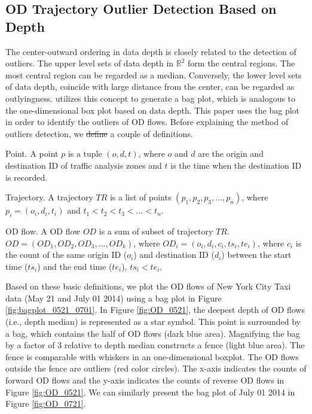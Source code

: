 \documentclass[a4paper,UKenglish]{lipics-v2016}
\providecommand{\DIFadd}[1]{{\protect\color{blue}\uwave{#1}}} %
\providecommand{\DIFdel}[1]{{\protect\color{red}\sout{#1}}}                      %
\providecommand{\DIFaddbegin}{} %
\providecommand{\DIFaddend}{} %
\providecommand{\DIFdelbegin}{} %
\providecommand{\DIFdelend}{} %
\begin{document}
\subsection{OD  {Trajectory } Outlier Detection Based on Depth}
The center-outward ordering in data depth is closely related to the detection of outliers.
The upper level sets of data depth in $\mathbb{R}^2$ form the central regions.
The most central region can be regarded as a median.
Conversely, the lower level sets of data depth, coincide with large distance from the center, can be regarded as outlyingness. \cite{rousseeuw99AS,aplpackR} utilizes this concept to generate a bag plot, which is analogous to the one-dimensional box plot based on data depth.
This paper uses the bag plot in order to identify the outliers of OD flows. 
Before explaining the method of outliers detection, we \DIFdelbegin \DIFdel{define }\DIFdelend \DIFaddbegin \DIFadd{first introduce }\DIFaddend a couple of definitions.

\begin{definition}{Point.}
	A point $p$ is a tuple $(o,d,t)$, where $o$ and $d$  are the origin and destination ID of  traffic analysis zones and $t$ is the time when the destination ID is recorded.
\end{definition}

\begin{definition}{Trajectory.}
	A trajectory $TR$ is a list of points $(p_1, p_2, p_3,...,p_n)$, where $p_i = (o_i,d_i,t_i)$ and $t_1<t_2<t_3<...<t_n$.
\end{definition}

\begin{definition}{OD flow.}
	A OD flow $OD$ is a sum of subset of trajectory $TR$. $OD = (OD_1, OD_2, OD_3,...,OD_k)$, where $OD_i = (o_i,d_i,c_i,ts_i, te_i)$, where $c_i$ is the count of the same origin ID ($o_i$) and destination ID ($d_i$) between the start time ($ts_i$) and the end time ($te_i$), $ts_i<te_i$.
\end{definition}

Based on these basic definitions, we plot the OD flows of New York City Taxi data (May 21 and July 01 2014) using a bag plot in Figure \ref{fig:bagplot_0521_0701}. In Figure \ref{fig:OD_0521}, the deepest depth of OD flows (i.e., depth median) is represented as a star symbol. This point is surrounded by a bag, which contains the half of OD flows (dark blue area). Magnifying the bag by a factor of 3 relative to depth median constructs a fence (light blue area). The fence is comparable with whiskers in an one-dimensional boxplot. The OD flows outside the fence are outliers (red color circles). The x-axis indicates the counts of forward OD flows and the y-axis indicates  the counts of reverse OD flows in Figure \ref{fig:OD_0521}. We can similarly present the bag plot of July 01 2014 in Figure \ref{fig:OD_0721}.
\end{document}
